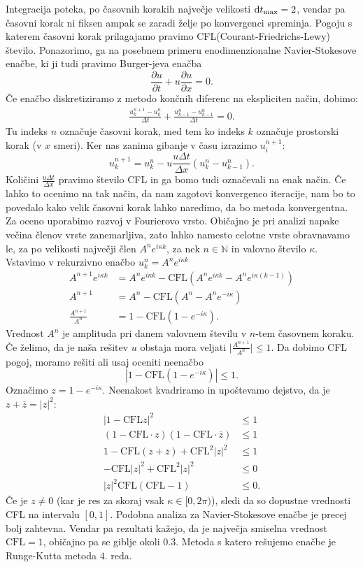 \documentclass[mat2, tisk]{fmfdelo}
\begin{document}
Integracija poteka, po časovnih korakih največje velikosti $\dif t_{\text{max}} = 2$, vendar pa časovni 
korak ni fiksen ampak se zaradi želje po konvergenci spreminja. Pogoju s
katerem časovni korak prilagajamo pravimo 
CFL(Courant-Friedrichs-Lewy) število. Ponazorimo, ga na posebnem 
primeru enodimenzionalne Navier-Stokesove enačbe, ki ji tudi pravimo 
Burger-jeva enačba
$$
\frac{\partial u}{\partial t} + u \frac{\partial u}{\partial x} = 0.
$$
Če enačbo diskretiziramo z metodo končnih diferenc na ekspliciten način, dobimo:
\begin{align*}
\frac{u_k^{n+1} - u_k^{n}}{\Delta t} + \frac{u_{k-1}^{n} - u_{k-1}^{n}}{\Delta t} = 0.
\end{align*}
Tu indeks $n$ označuje časovni korak, med tem ko indeks $k$ označuje prostorski korak (v $x$ smeri).
Ker nas zanima gibanje v času izrazimo $u_i^{n+1}$:
$$
u_k^{n+1} = u_k^{n} - u\frac{u \Delta t}{\Delta x}(u_{k}^{n} - u_{k-1}^{n}).
$$
Količini $\frac{u \Delta t}{\Delta x}$ pravimo število CFL in ga bomo 
tudi označevali na enak način. Če lahko to ocenimo na tak način, da
nam zagotovi konvergenco iteracije, nam bo to povedalo kako velik 
časovni korak lahko naredimo, da bo metoda konvergentna.
Za oceno uporabimo razvoj v Fourierovo vrsto. Običajno je pri analizi
 napake večina členov vrste zanemarljiva, zato lahko namesto celotne 
 vrste obravnavamo le, za po velikosti največji člen 
 $A^n e^{i\kappa k}$, za nek $n\in \mathbb{N}$ in valovno število 
 $\kappa$. Vstavimo v rekurzivno enačbo $u_k^n = A^n e^{i\kappa k}$
\begin{align*}
A^{n+1} e^{i\kappa k} &= A^n e^{i\kappa k} - \text{CFL} (A^n e^{i\kappa k} - A^n e^{i\kappa (k-1)}) \\
A^{n+1} &= A^n - \text{CFL} (A^n - A^n e^{-i\kappa}) \\ 
\frac{A^{n+1}}{A^n} &= 1 - \text{CFL}(1 - e^{-i\kappa}).
\end{align*}
Vrednost $A^n$ je amplituda pri danem valovnem številu v $n$-tem časovnem koraku. Če želimo, da je naša rešitev $u$ obstaja mora veljati $\Big|\frac{A^{n+1}}{A^n}\Big| \leq 1$. Da dobimo CFL pogoj, moramo rešiti ali usaj oceniti neenačbo 
$$
|1 - \text{CFL}(1 - e^{-i\kappa})| \leq 1. 
$$
Označimo $z = 1 - e^{-i\kappa}$. Neenakost kvadriramo in upoštevamo dejstvo, da je 
$z+\overline{z} = |z|^2$:
\begin{align*}
  |1 - \text{CFL} z|^2 &\leq 1 \\
  (1 - \text{CFL}\cdot z)(1- \text{CFL}\cdot \overline{z}) &\leq 1 \\
  1 - \text{CFL}(z + \overline{z}) + \text{CFL}^2 |z|^2 &\leq 1 \\
  - \text{CFL}|z|^2 + \text{CFL}^2 |z|^2 &\leq 0 \\
  |z|^2 \text{CFL}(\text{CFL} - 1)&\leq 0.
\end{align*}
Če je $z \neq 0$ (kar je res za skoraj vsak $\kappa \in [0, 2\pi)$), sledi da 
so dopustne vrednosti CFL na intervalu $[0, 1]$. Podobna analiza 
za Navier-Stokesove enačbe je precej bolj zahtevna. Vendar pa rezultati
kažejo, da je največja smiselna vrednost $\text{CFL} = 1$, običajno pa se giblje okoli $0.3$.
Metoda s katero rešujemo enačbe je Runge-Kutta metoda $4$. reda.
\end{document}
